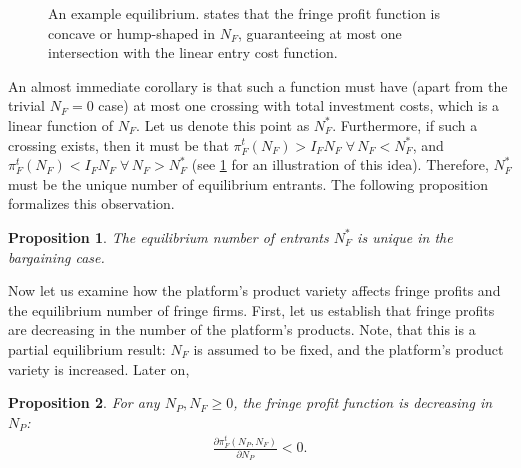 \documentclass[a4paper]{article}
\newtheorem{proposition}{Proposition}
\begin{document}
\begin{figure}[ht]
    \centering
    \caption{An example equilibrium.  states that the fringe profit function is concave or hump-shaped in $N_F$, guaranteeing at most one intersection with the linear entry cost function.}
    \label{fig:equilibrium}
\end{figure}

An almost immediate corollary is that such a function must have (apart from the trivial $N_F=0$ case) at most one crossing with total investment costs, which is a linear function of $N_F$.
Let us denote this point as $N_F^*$.
Furthermore, if such a crossing exists, then it must be that $\pi_F^t(N_F) > I_F N_F \;\forall\, N_F < N_F^*$, and $\pi_F^t(N_F) < I_F N_F \;\forall\, N_F > N_F^*$ (see \cref{fig:equilibrium} for an illustration of this idea).
Therefore, $N_F^*$ must be the unique number of equilibrium entrants.
The following proposition formalizes this observation.
\begin{proposition}
    \label{prop:unique_equilibrium}
    The equilibrium number of entrants $N_F^*$ is unique in the bargaining case.
\end{proposition}

Now let us examine how the platform's product variety affects fringe profits and the equilibrium number of fringe firms.
First, let us establish that fringe profits are decreasing in the number of the platform's products.
Note, that this is a partial equilibrium result: $N_F$ is assumed to be fixed, and the platform's product variety is increased.
Later on, 
\begin{proposition}
    \label{prop:fringe_profits_partial}
    For any $N_P, N_F \geq 0$, the fringe profit function is decreasing in $N_P$:
    \begin{align*}
        \frac{\partial \pi_F^t(N_P, N_F)}{\partial N_P} < 0.
    \end{align*}
\end{proposition}
\end{document}
